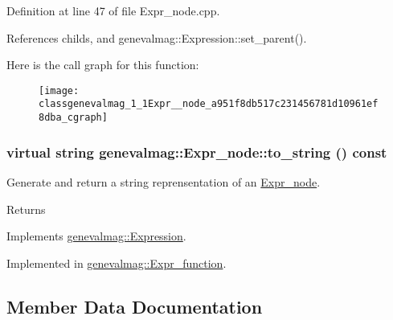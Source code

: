 Definition at line 47 of file Expr\_\-node.cpp.



References childs, and genevalmag::Expression::set\_\-parent().



Here is the call graph for this function:\nopagebreak
\begin{figure}[H]
\begin{center}
\leavevmode
\texttt{[image: classgenevalmag\_1\_1Expr\_\_node\_a951f8db517c231456781d10961ef8dba\_cgraph]}
\end{center}
\end{figure}


\hypertarget{classgenevalmag_1_1Expr__node_adea1d8fbc1b01f018e18cedad871f6a7}{
\subsubsection[{to\_\-string}]{\setlength{\rightskip}{0pt plus 5cm}virtual string genevalmag::Expr\_\-node::to\_\-string () const}}
\label{classgenevalmag_1_1Expr__node_adea1d8fbc1b01f018e18cedad871f6a7}
Generate and return a string reprensentation of an \hyperlink{classgenevalmag_1_1Expr__node}{Expr\_\-node}. \begin{DoxyReturn}{Returns}

\end{DoxyReturn}


Implements \hyperlink{classgenevalmag_1_1Expression_a8685f44429501da942b1fe76880af6fe}{genevalmag::Expression}.



Implemented in \hyperlink{classgenevalmag_1_1Expr__function_adaaebd5427337bb2288c47a16af804d8}{genevalmag::Expr\_\-function}.



\subsection{Member Data Documentation}
\hypertarget{classgenevalmag_1_1Expr__node_a1fe0e44817e6f3ac688333e1714b31a3}{
\subsubsection[{childs}]{}}
\label{classgenevalmag_1_1Expr__node_a1fe0e44817e6f3ac688333e1714b31a3}


